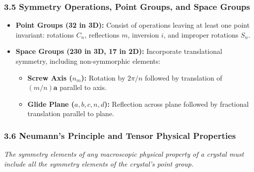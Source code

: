 \documentclass[11pt,a4paper]{article}
\begin{document}
\subsubsection{3.5 Symmetry Operations, Point Groups, and Space Groups}
\begin{itemize}[leftmargin=1.5em]
    \item \textbf{Point Groups (32 in 3D):} Consist of operations leaving at least one point invariant: rotations $C_n$, reflections $m$, inversion $i$, and improper rotations $S_n$.
    \item \textbf{Space Groups (230 in 3D, 17 in 2D):} Incorporate translational symmetry, including non-symmorphic elements:
    \begin{itemize}
        \item \textbf{Screw Axis ($n_m$):} Rotation by $2\pi/n$ followed by translation of $(m/n)\mathbf{a}$ parallel to axis.
        \item \textbf{Glide Plane ($a, b, c, n, d$):} Reflection across plane followed by fractional translation parallel to plane.
    \end{itemize}
\end{itemize}

\subsubsection{3.6 Neumann's Principle and Tensor Physical Properties}

\begin{keybox}
\emph{The symmetry elements of any macroscopic physical property of a crystal must include all the symmetry elements of the crystal's point group.}
\end{keybox}
\end{document}
